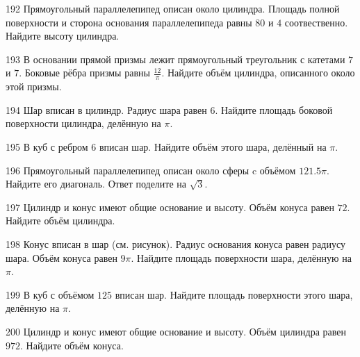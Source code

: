 \documentclass[4apaper]{article}
\begin{document}
\begin{taskBN}{192}
Прямоугольный параллелепипед описан около цилиндра. Площадь полной поверхности и сторона основания параллелепипеда равны $80$ и $4$ соотвественно. Найдите высоту цилиндра.
\end{taskBN}

\begin{taskBN}{193}
В основании прямой призмы лежит прямоугольный треугольник с катетами $7$ и $7$. Боковые рёбра призмы равны $\frac{12}{\pi}$. Найдите объём цилиндра, описанного около этой призмы.
\end{taskBN}

\begin{taskBN}{194}
Шар вписан в цилиндр. Радиус шара равен $6$. Найдите площадь боковой поверхности цилиндра, делённую на $\pi$.
\end{taskBN}

\begin{taskBN}{195}
В куб с ребром $6$ вписан шар. Найдите объём этого шара, делённый на $\pi$.
\end{taskBN}

\begin{taskBN}{196}
Прямоугольный параллелепипед описан около сферы c объёмом $121.5$$\pi$. Найдите его диагональ. Ответ поделите на $\sqrt{3}$.
\end{taskBN}

\begin{taskBN}{197}
Цилиндр и конус имеют общие основание и высоту. Объём конуса равен $72$. Найдите объём цилиндра.
\end{taskBN}

\begin{taskBN}{198}
Конус вписан в шар (см. рисунок).  Радиус основания конуса равен радиусу шара. Объём конуса равен $9\pi$. Найдите площадь поверхности шара, делённую на $\pi$.
\end{taskBN}

\begin{taskBN}{199}
В куб с объёмом $125$ вписан шар. Найдите площадь поверхности этого шара, делённую на $\pi$.
\end{taskBN}

\begin{taskBN}{200}
Цилиндр и конус имеют общие основание и высоту. Объём цилиндра равен $972$. Найдите объём конуса.
\end{taskBN}
\end{document}
